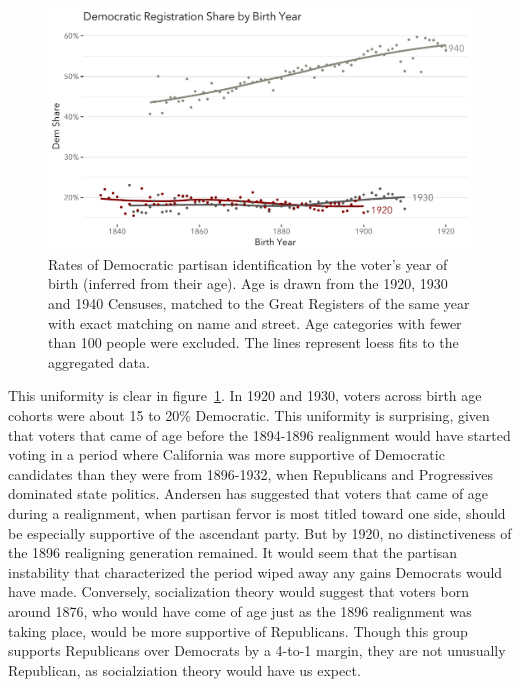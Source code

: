 \documentclass[11pt]{scrartcl}\usepackage[]{graphicx}\usepackage[]{color}
\makeatletter
\def\maxwidth{ %
  \ifdim\Gin@nat@width>\linewidth
    \linewidth
  \else
    \Gin@nat@width
  \fi
}
\newenvironment{knitrout}{}{} %
\makeatother
\begin{document}
\begin{knitrout}
\color{fgcolor}\begin{figure}

{\centering \includegraphics[width=\maxwidth]{figures/plots-age-1} 

}

\caption[Rates of Democratic partisan identification by the voter's year of birth (inferred from their age)]{Rates of Democratic partisan identification by the voter's year of birth (inferred from their age). Age is drawn from the 1920, 1930 and 1940 Censuses, matched to the Great Registers of the same year with exact matching on name and street. Age categories with fewer than 100 people were excluded. The lines represent loess fits to the aggregated data.}\label{fig:age}
\end{figure}


\end{knitrout}

This uniformity is clear in figure~\ref{fig:age}. In 1920 and 1930, voters across birth age cohorts were about 15 to 20\% Democratic. This uniformity is surprising, given that voters that came of age before the 1894-1896 realignment would have started voting in a period where California was more supportive of Democratic candidates than they were from 1896-1932, when Republicans and Progressives dominated state politics. Andersen \citeyearpar{andersen1979creation} has suggested that voters that came of age during a realignment, when partisan fervor is most titled toward one side, should be especially supportive of the ascendant party. But by 1920, no distinctiveness of the 1896 realigning generation remained.  It would seem that the partisan instability that characterized the period wiped away any gains Democrats would have made.  Conversely, socialization theory would suggest that voters born around 1876, who would have come of age just as the 1896 realignment was taking place, would be more supportive of Republicans. Though this group supports Republicans over Democrats by a 4-to-1 margin, they are not unusually Republican, as socialziation theory would have us expect. 
\end{document}
